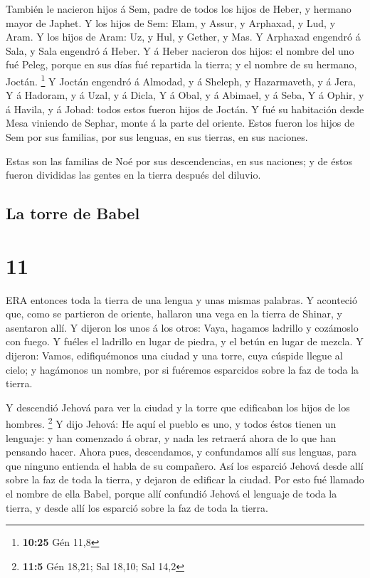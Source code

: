  También le nacieron hijos á Sem, padre de todos los hijos
de Heber, y hermano mayor de Japhet.  Y los hijos de Sem:
Elam, y Assur, y Arphaxad, y Lud, y Aram.  Y los hijos de
Aram: Uz, y Hul, y Gether, y Mas.  Y Arphaxad engendró á
Sala, y Sala engendró á Heber.  Y á Heber nacieron dos
hijos: el nombre del uno fué Peleg, porque en sus días fué repartida la
tierra; y el nombre de su hermano, Joctán. \footnote{\textbf{10:25} Gén
  11,8}  Y Joctán engendró á Almodad, y á Sheleph, y
Hazarmaveth, y á Jera,  Y á Hadoram, y á Uzal, y á Dicla,
 Y á Obal, y á Abimael, y á Seba,  Y á Ophir,
y á Havila, y á Jobad: todos estos fueron hijos de Joctán. 
Y fué su habitación desde Mesa viniendo de Sephar, monte á la parte del
oriente.  Estos fueron los hijos de Sem por sus familias,
por sus lenguas, en sus tierras, en sus naciones.

 Estas son las familias de Noé por sus descendencias, en
sus naciones; y de éstos fueron divididas las gentes en la tierra
después del diluvio.

\hypertarget{la-torre-de-babel}{%
\subsection{La torre de Babel}\label{la-torre-de-babel}}

\hypertarget{section-10}{%
\section{11}\label{section-10}}

 ERA entonces toda la tierra de una lengua y unas mismas
palabras.  Y aconteció que, como se partieron de oriente,
hallaron una vega en la tierra de Shinar, y asentaron allí. 
Y dijeron los unos á los otros: Vaya, hagamos ladrillo y cozámoslo con
fuego. Y fuéles el ladrillo en lugar de piedra, y el betún en lugar de
mezcla.  Y dijeron: Vamos, edifiquémonos una ciudad y una
torre, cuya cúspide llegue al cielo; y hagámonos un nombre, por si
fuéremos esparcidos sobre la faz de toda la tierra.

 Y descendió Jehová para ver la ciudad y la torre que
edificaban los hijos de los hombres. \footnote{\textbf{11:5} Gén 18,21;
  Sal 18,10; Sal 14,2}  Y dijo Jehová: He aquí el pueblo es
uno, y todos éstos tienen un lenguaje: y han comenzado á obrar, y nada
les retraerá ahora de lo que han pensando hacer.  Ahora
pues, descendamos, y confundamos allí sus lenguas, para que ninguno
entienda el habla de su compañero.  Así los esparció Jehová
desde allí sobre la faz de toda la tierra, y dejaron de edificar la
ciudad.  Por esto fué llamado el nombre de ella Babel,
porque allí confundió Jehová el lenguaje de toda la tierra, y desde allí
los esparció sobre la faz de toda la tierra.

